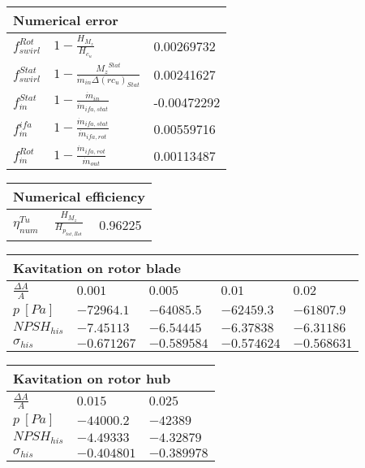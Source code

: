 \vspace{20pt}\newline
\begin{tabular}{|l|l|l|}
\multicolumn{3}{l}{Numerical error} \\ 
\hline
$f_{swirl}^{Rot}$ &$1-\frac{H_{M_z}}{H_{c_u}}$ & 0.00269732 \\ 
\hline
$f_{swirl}^{Stat}$ &$1-\frac{{M_z}^{Stat}}{\dot m_{in}\Delta(rc_u)_{Stat}}$ & 0.00241627 \\ 
\hline
$f_{\dot m}^{Stat}$ &$1-\frac{\dot m_{in}}{\dot m_{ifa,stat}}$ & -0.00472292 \\ 
\hline
$f_{\dot m}^{ifa}$ &$1-\frac{\dot m_{ifa,stat}}{\dot m_{ifa,rot}}$ & 0.00559716 \\ 
\hline
$f_{\dot m}^{Rot}$ &$1-\frac{\dot m_{ifa,rot}}{\dot m_{out}}$ & 0.00113487 \\ 
\hline
\end{tabular}
\vspace{20pt}\newline
\begin{tabular}{|l|l|l|}
\multicolumn{3}{l}{Numerical efficiency} \\ 
\hline
$\eta^{Tu}_{num}$ &$\frac{H_{M_z}}{H_{p_{tot,Rot}}}$ & 0.96225 \\ 
\hline
\end{tabular}
\vspace{20pt}\newline
\begin{tabular}{|l|l|l|l|l|}
\multicolumn{5}{l}{Kavitation on rotor blade} \\ 
\hline
$\frac{\Delta A}{A}$ & $0.001$& $0.005$& $0.01$& $0.02$  \\ 
\hline
$p \ [Pa]$ & $-72964.1$& $-64085.5$& $-62459.3$& $-61807.9$  \\ 
\hline
$NPSH_{his}$ & $-7.45113$& $-6.54445$& $-6.37838$& $-6.31186$  \\ 
\hline
$\sigma_{his}$ & $-0.671267$& $-0.589584$& $-0.574624$& $-0.568631$  \\ 
\hline
\end{tabular}
\vspace{20pt}\newline
\begin{tabular}{|l|l|l|}
\multicolumn{3}{l}{Kavitation on rotor hub} \\ 
\hline
$\frac{\Delta A}{A}$ & $0.015$& $0.025$  \\ 
\hline
$p \ [Pa]$ & $-44000.2$& $-42389$  \\ 
\hline
$NPSH_{his}$ & $-4.49333$& $-4.32879$  \\ 
\hline
$\sigma_{his}$ & $-0.404801$& $-0.389978$  \\ 
\hline
\end{tabular}
